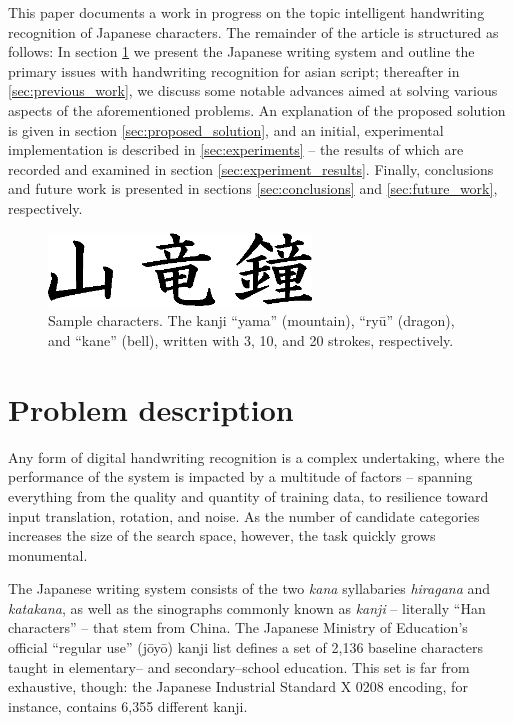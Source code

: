 \documentclass[10pt,conference,a4paper]{IEEEtran}
\begin{document}
	This paper documents a work in progress on the topic intelligent handwriting recognition of Japanese characters.
	The remainder of the article is structured as follows:
	In section \ref{sec:problem_description} we present the Japanese writing system and outline the primary issues with handwriting recognition for asian script;
	thereafter in \ref{sec:previous_work}, we discuss some notable advances aimed at solving various aspects of the aforementioned problems.
	An explanation of the proposed solution is given in section \ref{sec:proposed_solution}, and an initial, experimental implementation is described in \ref{sec:experiments}
	-- the results of which are recorded and examined in section \ref{sec:experiment_results}. Finally, conclusions and future work is presented in sections
	\ref{sec:conclusions} and \ref{sec:future_work}, respectively.

	
	\begin{figure}
		\centering
		\includegraphics[width=2.75in]{./fig/yama-ryuu-kane.eps}
		\caption{Sample characters. The kanji ``yama'' (mountain), ``ry\=u'' (dragon), and ``kane'' (bell), written with 3, 10, and 20 strokes, respectively.}
		\label{fig_kanji_sample}
	\end{figure}


	\section{Problem description}
	\label{sec:problem_description}

	Any form of digital handwriting recognition is a complex undertaking,
	where the performance of the system is impacted by a multitude of factors -- spanning
	everything from the quality and quantity of training data, to resilience toward input
	translation, rotation, and noise. As the number of candidate categories increases
	the size of the search space, however, the task quickly grows monumental.

	The Japanese writing system consists of the two \emph{kana} syllabaries \emph{hiragana} and \emph{katakana},
	as well as the sinographs commonly known as \emph{kanji} -- literally ``Han characters'' -- that stem from China.
	The Japanese Ministry of Education's official ``regular use'' (j\=oy\=o) kanji list defines a set of 2,136
	baseline characters taught in elementary-- and secondary--school education. \cite{hadamitzky2012japanese}
	This set is far from exhaustive, though: the Japanese Industrial Standard X 0208 encoding, for instance, contains 6,355 different kanji.
\end{document}
